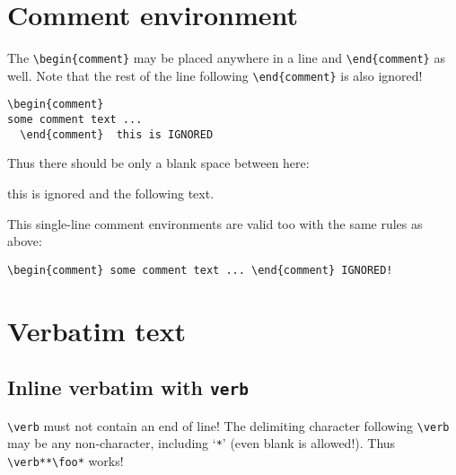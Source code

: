 \documentclass[a4paper]{article}
\begin{document}

\section{Comment environment}

The \verb!\begin{comment}! may be placed anywhere in a line and
\verb!\end{comment}! as well.
Note that the rest of the line following \verb!\end{comment}! is also ignored!
%
\begin{verbatim}
\begin{comment}
some comment text ...
  \end{comment}  this is IGNORED
\end{verbatim}
%
Thus there should be only a blank space between here: \begin{comment} some comment text ...
   \end{comment}  this is ignored
and the following text.

\noindent
This single-line comment environments are valid too with the same rules as above:
%
\begin{verbatim}
\begin{comment} some comment text ... \end{comment} IGNORED!
\end{verbatim}


\section{Verbatim text}

\subsection{Inline verbatim with \texttt{verb}}

\verb!\verb! must not contain an end of line!
The delimiting character following \verb!\verb! may be any non-character, including 
`\texttt{*}' (even blank is allowed!).
Thus \verb!\verb**\foo*! works!
\end{document}
